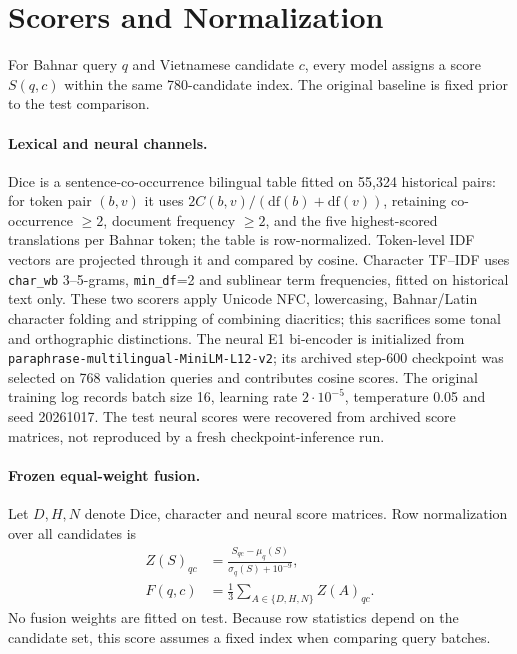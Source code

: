 \section{Scorers and Normalization}\label{sec:methods}
For Bahnar query $q$ and Vietnamese candidate $c$, every model assigns a score $S(q,c)$ within the same 780-candidate index. The original baseline is fixed prior to the test comparison.

\paragraph{Lexical and neural channels.} Dice is a sentence-co-occurrence bilingual table fitted on 55,324 historical pairs: for token pair $(b,v)$ it uses $2C(b,v)/(\mathrm{df}(b)+\mathrm{df}(v))$, retaining co-occurrence $\geq2$, document frequency $\geq2$, and the five highest-scored translations per Bahnar token; the table is row-normalized. Token-level IDF vectors are projected through it and compared by cosine. Character TF--IDF uses \texttt{char\_wb} 3--5-grams, \texttt{min\_df}=2 and sublinear term frequencies, fitted on historical text only. These two scorers apply Unicode NFC, lowercasing, Bahnar/Latin character folding and stripping of combining diacritics; this sacrifices some tonal and orthographic distinctions. The neural E1 bi-encoder is initialized from \texttt{paraphrase-multilingual-}\allowbreak\texttt{MiniLM-L12-v2}; its archived step-600 checkpoint was selected on 768 validation queries and contributes cosine scores. The original training log records batch size 16, learning rate $2\cdot 10^{-5}$, temperature 0.05 and seed 20261017. The test neural scores were recovered from archived score matrices, not reproduced by a fresh checkpoint-inference run.

\paragraph{Frozen equal-weight fusion.} Let $D,H,N$ denote Dice, character and neural score matrices. Row normalization over all candidates is
\begin{align}
Z(S)_{qc} &= \frac{S_{qc}-\mu_q(S)}{\sigma_q(S)+10^{-9}},\nonumber\\
F(q,c) &= \frac13\sum_{A\in\{D,H,N\}}Z(A)_{qc}.
\label{eq:fusion}
\end{align}
No fusion weights are fitted on test. Because row statistics depend on the candidate set, this score assumes a fixed index when comparing query batches.

